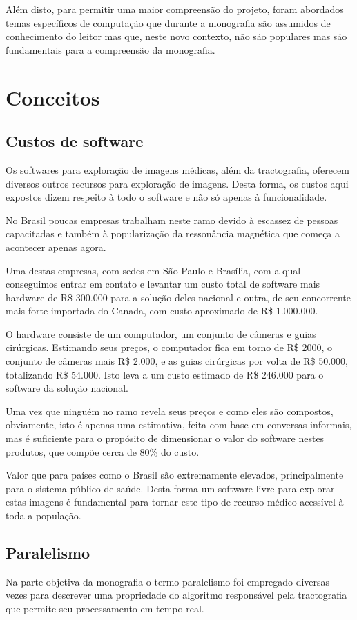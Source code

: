 \documentclass[a4paper,11pt]{report}
\begin{document}
Além disto, para permitir uma maior compreensão do projeto, foram abordados temas específicos de computação que durante a monografia são assumidos de conhecimento do leitor mas que, neste novo contexto, não são populares mas são fundamentais para a compreensão da monografia.

\chapter{Conceitos}
  \section{Custos de software}
  Os softwares para exploração de imagens médicas, além da tractografia, oferecem diversos outros recursos para exploração de imagens. Desta forma, os custos aqui expostos dizem respeito à todo o software e não só apenas à funcionalidade.
  
  No Brasil poucas empresas trabalham neste ramo devido à escassez de pessoas capacitadas e também à popularização da ressonância magnética que começa a acontecer apenas agora.
  
  Uma destas empresas, com sedes em São Paulo e Brasília, com a qual conseguimos entrar em contato e levantar um custo total de software mais hardware de R\$ 300.000 para a solução deles nacional e outra, de seu concorrente mais forte importada do Canada, com custo aproximado de R\$ 1.000.000.
  
  O hardware consiste de um computador, um conjunto de câmeras e guias cirúrgicas. Estimando seus preços, o computador fica em torno de R\$ 2000, o conjunto de câmeras mais R\$ 2.000, e as guias cirúrgicas por volta de R\$ 50.000, totalizando R\$ 54.000. Isto leva a um custo estimado de R\$ 246.000 para o software da solução nacional.
  
  Uma vez que ninguém no ramo revela seus preços e como eles são compostos, obviamente, isto é apenas uma estimativa, feita com base em conversas informais, mas é suficiente para o propósito de dimensionar o valor do software nestes produtos, que compõe cerca de 80\% do custo.
  
  Valor que para países como o Brasil são extremamente elevados, principalmente para o sistema público de saúde. Desta forma um software livre para explorar estas imagens é fundamental para tornar este tipo de recurso médico acessível à toda a população.
  
  \section{Paralelismo}
    Na parte objetiva da monografia o termo paralelismo foi empregado diversas vezes para descrever uma propriedade do algoritmo responsável pela tractografia que permite seu processamento em tempo real.
    
\end{document}
